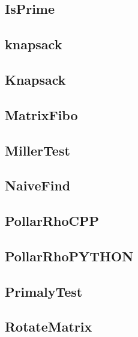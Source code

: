 \subsection{ IsPrime}
\raggedbottom
\hrulefill
\subsection{ knapsack}
\raggedbottom
\hrulefill
\subsection{ Knapsack}
\raggedbottom
\hrulefill
\subsection{ MatrixFibo}
\raggedbottom
\hrulefill
\subsection{ MillerTest}
\raggedbottom
\hrulefill
\subsection{ NaiveFind}
\raggedbottom
\hrulefill
\subsection{ PollarRhoCPP}
\raggedbottom
\hrulefill
\subsection{ PollarRhoPYTHON}
\raggedbottom
\hrulefill
\subsection{ PrimalyTest}
\raggedbottom
\hrulefill
\subsection{ RotateMatrix}
\raggedbottom
\hrulefill

